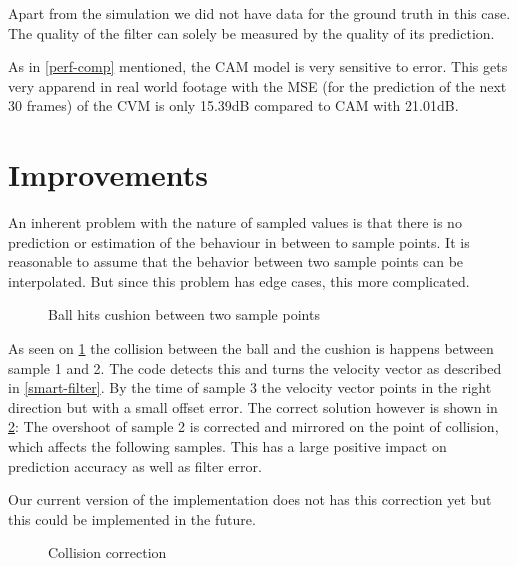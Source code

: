 \documentclass[notitlepage, a4paper, 11pt]{scrartcl}
\begin{document}
\begin{multicols}{2}
Apart from the simulation we did not have data for the ground truth in this case. 
The quality of the filter can solely be measured by the quality of its prediction. 

As in \cref{perf-comp} mentioned, the CAM model is very sensitive to error. This gets very apparend in real world footage with the MSE (for the prediction of the next 30 frames) of the CVM is only 15.39dB compared to CAM with 21.01dB.

\section{Improvements}

An inherent problem with the nature of sampled values is that there is no prediction or estimation
of the behaviour in between to sample points. It is reasonable to assume that the behavior between
two sample points can be interpolated. But since this problem has edge cases, this more complicated.

\begin{figure}[H]
    \centering
    \caption{Ball hits cushion between two sample points}
    \label{fig:edge-case}
\end{figure}

As seen on \cref{fig:edge-case} the collision between the ball and the cushion is happens between sample 1 and 2. The code detects this and turns the velocity vector as described in \cref{smart-filter}.
By the time of sample 3 the velocity vector points in the right direction but with a small offset error. The correct solution however is shown in \cref{fig:edge-case-sol}:
The overshoot of sample 2 is corrected and mirrored on the point of collision, which affects the following samples. This has a large positive impact on prediction accuracy as well as filter error.

Our current version of the implementation does not has this correction yet but this could be implemented in the future.

\begin{figure}[H]
    \centering
    \caption{Collision correction}
    \label{fig:edge-case-sol}
\end{figure}


\end{multicols}
\end{document}
